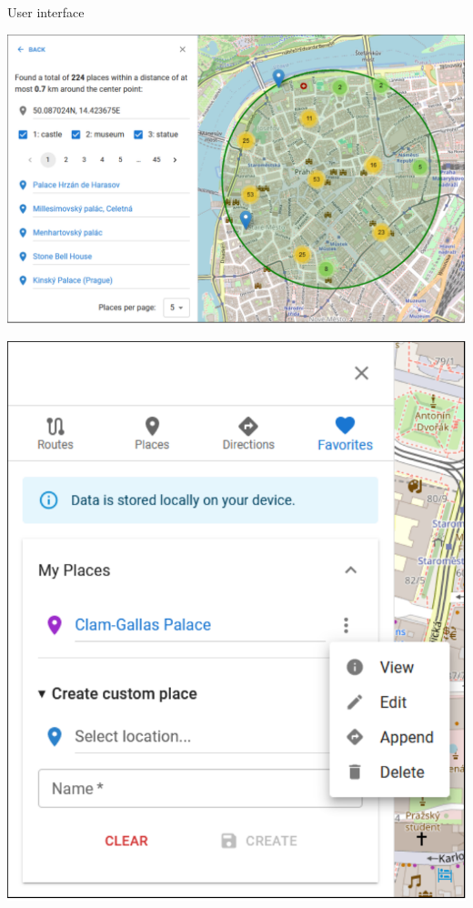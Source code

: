 \documentclass[portrait,a0paper,fontscale=0.25]{baposter}
\begin{document}
\begin{poster}
\begin{posterbox}[column=1, name=ui]{User interface}
\begin{minipage}{1.00\textwidth}
\begin{minipage}{0.62\textwidth}
\includegraphics[width=1.00\linewidth]{./img/poster/result-places.pdf}
\end{minipage}
\hfill
\begin{minipage}{0.36\textwidth}
\includegraphics[width=1.00\linewidth]{./img/poster/favorites.pdf}
\end{minipage}
\end{minipage}


\end{posterbox}
\end{poster}
\end{document}
